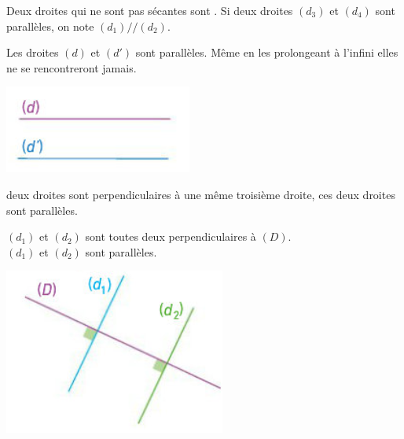 \begin{mydef}
	Deux droites qui ne sont pas sécantes sont . Si deux droites $(d_3)$ et $(d_4)$ sont parallèles, on note $(d_1) // (d_2)$.
\end{mydef}

\begin{myex}
	\begin{multicols}{2}
		Les droites $(d)$ et $(d')$ sont parallèles. Même en les prolongeant à l'infini elles ne se rencontreront jamais.
		
		\includegraphics[scale=0.6]{img/para1}
	\end{multicols}
	
\end{myex}

\begin{myprop}
	 deux droites sont perpendiculaires à une même troisième droite,  ces deux droites sont parallèles.
\end{myprop}


\begin{myex}
	\begin{multicols}{2}
		 $(d_1)$ et $(d_2)$ sont toutes deux perpendiculaires à $(D)$.\\
		 $(d_1)$ et $(d_2)$ sont parallèles.
		
		\includegraphics[scale=0.6]{img/para2}
	\end{multicols}
	
\end{myex}